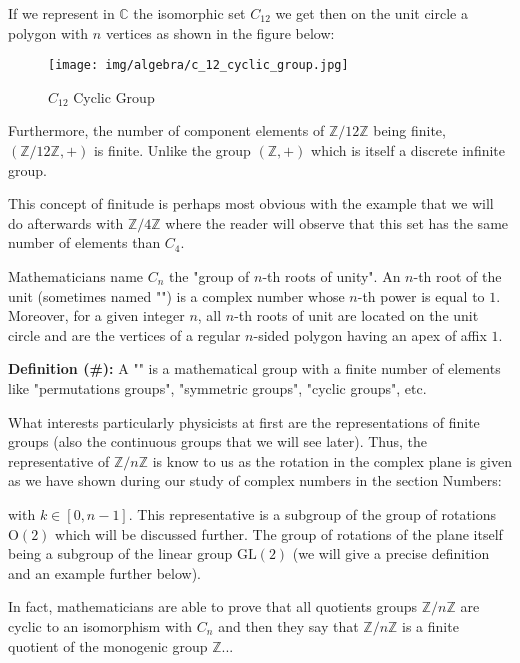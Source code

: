 \begin{enumerate}
		If we represent in $\mathbb{C}$ the isomorphic set $C_{12}$ we get then on the unit circle a polygon with $n$ vertices as shown in the figure below:
		\begin{figure}[H]
			\centering
			\texttt{[image: img/algebra/c\_12\_cyclic\_group.jpg]}
			\caption{$C_{12}$ Cyclic Group}
		\end{figure}
		Furthermore, the number of component elements of $\mathbb{Z}/12\mathbb{Z}$ being finite, $(\mathbb{Z}/12\mathbb{Z},+)$ is finite. Unlike the group $(\mathbb{Z},+)$ which is itself a discrete infinite group.
		
		This concept of finitude is perhaps most obvious with the example that we will do afterwards with $\mathbb{Z}/4\mathbb{Z}$ where the reader will observe that this set has the same number of elements than $C_4$.	
	\end{enumerate}
	
	\begin{tcolorbox}[title=Remark,colframe=black,arc=10pt]
	Mathematicians name $C_n$ the "group of $n$-th roots of unity". An $n$-th root of the unit (sometimes named "") is a complex number whose $n$-th power is equal to $1$. Moreover, for a given integer $n$, all $n$-th roots of unit are located on the unit circle and are the vertices of a regular $n$-sided polygon having an apex of affix $1$.
	\end{tcolorbox}
	
	\textbf{Definition (\#\mydef):} A "\label{finite group}" is a mathematical group with a finite number of elements like "permutations groups", "symmetric groups", "cyclic groups", etc.
	
	What interests particularly physicists at first are the representations of finite groups (also the continuous groups that we will see later). Thus, the representative of $\mathbb{Z}/n\mathbb{Z}$ is know to us as the rotation in the complex plane is given as we have shown during our study of complex numbers in the section Numbers:
	
	with $k\in[0,n-1]$. This representative is a subgroup of the group of rotations $\text{O}(2)$ which will be discussed further. The group of rotations of the plane itself being a subgroup of the linear group $\text{GL}(2)$ (we will give a precise definition and an example further below).
	
	In fact, mathematicians are able to prove that all quotients groups $\mathbb{Z}/n\mathbb{Z}$ are cyclic to an isomorphism with $C_n$ and then they say that $\mathbb{Z}/n\mathbb{Z}$ is a finite quotient of the monogenic group $\mathbb{Z}$...
	
